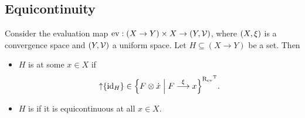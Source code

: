 \subsection{Equicontinuity}
\begin{definition}
Consider the evaluation map $\evalMap: (X\to Y)\times X \to \sSet{Y,\mathcal{V}}$, where $\sSet{X, \xi}$ is a convergence space and $\sSet{Y, \mathcal{V}}$ a uniform space. Let $H\subseteq (X\to Y)$ be a set. Then
\begin{itemize}
\item $H$ is  at some $x\in X$ if
\[ \upset\{\id_H\} \in \setbuilder{F\otimes \pfilter{x}}{F\overset{\xi}{\longrightarrow}x}^{\uRelEv^\transp}. \]
\item $H$ is  if it is equicontinuous at all $x\in X$.
\end{itemize}
\end{definition}

